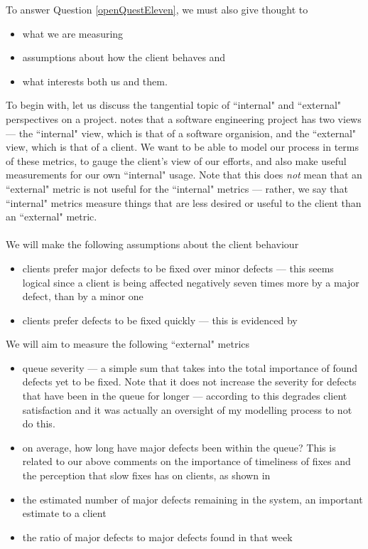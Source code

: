 To answer Question \ref{openQuestEleven}, we must also give thought to 
\begin{itemize}
	\item what we are measuring
	\item assumptions about how the client behaves and
	\item what interests both us and them.
\end{itemize}

To begin with, let us discuss the tangential topic of ``internal" and ``external"
perspectives on a project.
\FIXME notes that a software engineering project has two views --- the ``internal" view, which is
that of a software organision, and the ``external" view, which is that of a client.
We want to be able to model our process in terms of these metrics, to gauge the client's view of our
efforts, and also make useful measurements for our own ``internal" usage.
Note that this does {\em not} mean that an ``external" metric is not useful for the ``internal"
metrics --- rather, we say that ``internal" metrics measure things that are less desired or useful
to the client than an ``external" metric.\\
\\
We will make the following assumptions about the client behaviour
\begin{itemize}
	\item clients prefer major defects to be fixed over minor defects --- this seems logical since a
client is being affected negatively seven times more by a major defect, than by a minor one
	\item clients prefer defects to be fixed quickly --- this is evidenced by \FIXME
\end{itemize}

We will aim to measure the following ``external" metrics
\begin{itemize}
	\item queue severity --- a simple sum that takes into the total importance of found defects yet to
be fixed.
	Note that it does not increase the severity for defects that have been in the queue for longer ---
according to \FIXME this degrades client satisfaction and it was actually an oversight of my
modelling process to not do this.
	\item on average, how long have major defects been within the queue?
	This is related to our above comments on the importance of timeliness of fixes and the perception
that slow fixes has on clients, as shown in \FIXME
	\item the estimated number of major defects remaining in the system, an important estimate to a
client
	\item the ratio of major defects to major defects found in that week
\end{itemize}

